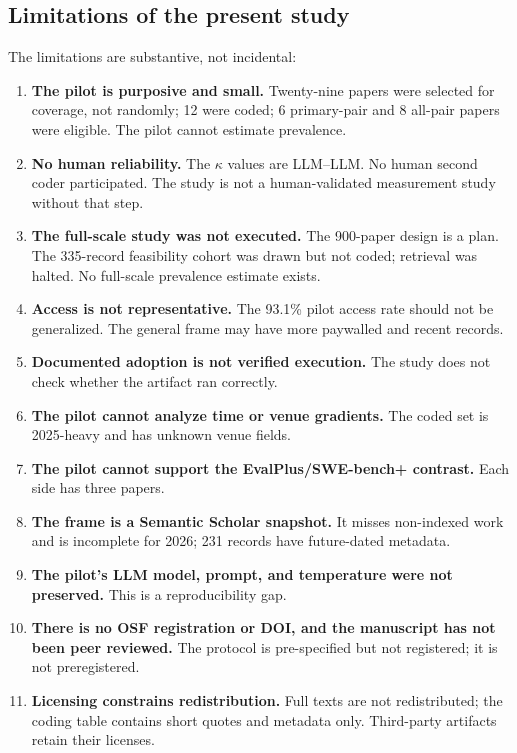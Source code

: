 \documentclass[11pt,a4paper]{article}
\begin{document}
\subsection{Limitations of the present study}

The limitations are substantive, not incidental:
\begin{enumerate}
  \item \textbf{The pilot is purposive and small.} Twenty-nine papers were selected for coverage, not randomly; 12 were coded; 6 primary-pair and 8 all-pair papers were eligible. The pilot cannot estimate prevalence.
  \item \textbf{No human reliability.} The $\kappa$ values are LLM--LLM. No human second coder participated. The study is not a human-validated measurement study without that step.
  \item \textbf{The full-scale study was not executed.} The 900-paper design is a plan. The 335-record feasibility cohort was drawn but not coded; retrieval was halted. No full-scale prevalence estimate exists.
  \item \textbf{Access is not representative.} The 93.1\% pilot access rate should not be generalized. The general frame may have more paywalled and recent records.
  \item \textbf{Documented adoption is not verified execution.} The study does not check whether the artifact ran correctly.
  \item \textbf{The pilot cannot analyze time or venue gradients.} The coded set is 2025-heavy and has unknown venue fields.
  \item \textbf{The pilot cannot support the EvalPlus/SWE-bench+ contrast.} Each side has three papers.
  \item \textbf{The frame is a Semantic Scholar snapshot.} It misses non-indexed work and is incomplete for 2026; 231 records have future-dated metadata.
  \item \textbf{The pilot's LLM model, prompt, and temperature were not preserved.} This is a reproducibility gap.
  \item \textbf{There is no OSF registration or DOI, and the manuscript has not been peer reviewed.} The protocol is pre-specified but not registered; it is not preregistered.
  \item \textbf{Licensing constrains redistribution.} Full texts are not redistributed; the coding table contains short quotes and metadata only. Third-party artifacts retain their licenses.
\end{enumerate}
\end{document}
